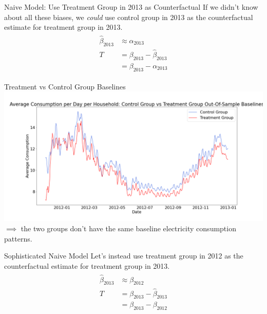 \documentclass{beamer}
\begin{document}
\begin{frame}{Naive Model: Use Treatment Group in 2013 as Counterfactual}
  If we didn't know about all these biases, we \textit{could} use control group in 2013 as the counterfactual estimate for treatment group in 2013.
  \begin{align}
    \begin{split}
      \hat\beta_{2013} & \approx \alpha_{2013} \\
      T & = \beta_{2013} - \hat\beta_{2013} \\
        & = \beta_{2013} - \alpha_{2013}
    \end{split}
  \end{align}
\end{frame}

\begin{frame}{Treatment vs Control Group Baselines}
  \centering
  \includegraphics[width=1\textwidth]{images/avg-consumption-per-day-baseline.png}
  $\implies$ the two groups don't have the same baseline electricity consumption patterns.
\end{frame}

\begin{frame}{Sophisticated Naive Model}
  Let's instead use treatment group in 2012 as the counterfactual estimate for treatment group in 2013.
  \begin{align}
    \begin{split}
      \hat\beta_{2013} & \approx \beta_{2012} \\
      T & = \beta_{2013} - \hat\beta_{2013} \\
        & = \beta_{2013} - \beta_{2012}
    \end{split}
  \end{align}
\end{frame}
\end{document}
